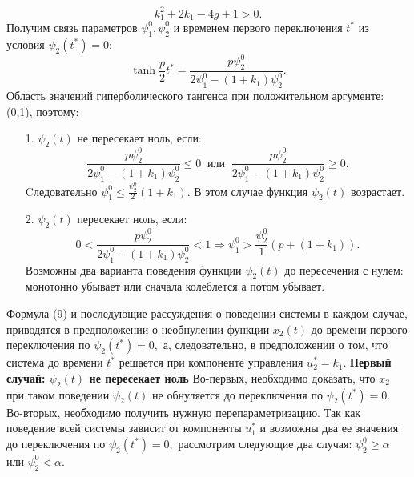 \documentclass[11pt]{article}
\begin{document}
{\begin{equation}
	 k_1^2 + 2k_1 -4g + 1 > 0.
	 \end{equation}
	 {Получим связь параметров $\psi_1^0,\psi_2^0$ и временем первого переключения $t^*$ из условия
	\newline 	
	 	 $\psi_2(t^*) = 0:$}
	 \begin{equation}
	 \tanh\frac{p}{2}t^* = \frac{p\psi_2^0}{2\psi_1^0 - (1 + k_1)\psi_2^0}.
	 \end{equation}
	 {Область значений гиперболического тангенса при положительном аргументе: (0,1), поэтому:}
	 \begin{itemize}
	 	\item [1.]{$\psi_2(t)$ не пересекает ноль, если:
		\[ \frac{p\psi_2^0}{2\psi_1^0 - (1 + k_1)\psi_2^0} \leq 0 \ \text{  или  }\ \frac{p\psi_2^0}{2\psi_1^0 - (1 + k_1)\psi_2^0} \geq 0. \]
		Cледовательно  $\psi_1^0 \leq \frac{\psi_2^0}{2}(1 + k_1).$ В этом случае функция $\psi_2(t)$ возрастает. 	
 	}
	 	\item [2.]{$\psi_2(t)$ пересекает ноль, если:
		\[0 < \frac{p\psi_2^0}{2\psi_1^0 - (1 + k_1)\psi_2^0} < 1 \Rightarrow \psi_1^0 > \frac{\psi_2^0}{1}(p + (1 + k_1)). \]
		Возможны два варианта поведения функции $\psi_2(t)$ до пересечения с нулем: монотонно убывает или сначала колеблется а потом убывает.	 	
 }
	 \end{itemize}
 	{Формула (9) и последующие рассуждения о поведении системы в каждом случае, приводятся в предположении о необнулении функции $x_2(t)$ до времени первого переключения по $\psi_2(t^*)= 0,$ а, следовательно, в предположении о том, что система до времени $t^*$ решается при компоненте управления $u_2^* = k_1$. }
 	\newline
 	{\textbf{Первый случай: $\psi_2(t)$ не пересекает ноль}}
 	\newline
 	{Во-первых, необходимо доказать, что $x_2$ при таком поведении $\psi_2(t)$ не обнуляется до переключения по $\psi_2(t^*) = 0.$ Во-вторых, необходимо получить нужную перепараметризацию. Так как поведение всей системы зависит от компоненты $u_1^*$ и возможны два ее значения до переключения по $\psi_2(t^*) = 0,$ рассмотрим следующие два случая: $\psi_2^0 \geq \alpha$ или $\psi_2^0 < \alpha.$ }
 	
}
\end{document}
